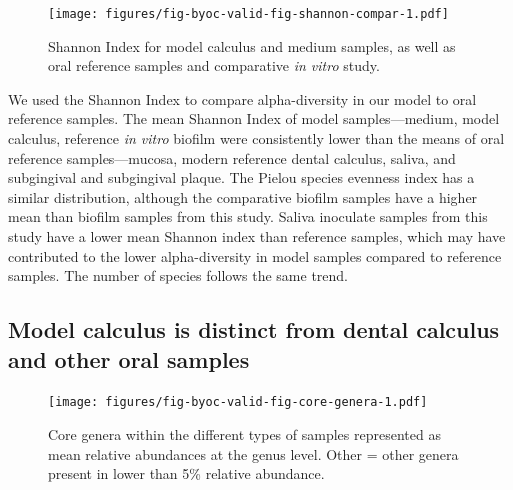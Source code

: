 \documentclass[
  letterpaper,
]{book}
\begin{document}
\begin{figure}

{\centering \texttt{[image: figures/fig-byoc-valid-fig-shannon-compar-1.pdf]}

}

\caption{\label{fig-shannon-compar}Shannon Index for model calculus and
medium samples, as well as oral reference samples and comparative
\emph{in vitro} study.}

\end{figure}

We used the Shannon Index to compare alpha-diversity in our model to
oral reference samples. The mean Shannon Index of model
samples---medium, model calculus, reference \emph{in vitro} biofilm were
consistently lower than the means of oral reference samples---mucosa,
modern reference dental calculus, saliva, and subgingival and
subgingival plaque. The Pielou species evenness index has a similar
distribution, although the comparative biofilm samples have a higher
mean than biofilm samples from this study. Saliva inoculate samples from
this study have a lower mean Shannon index than reference samples, which
may have contributed to the lower alpha-diversity in model samples
compared to reference samples. The number of species follows the same
trend.

\hypertarget{model-calculus-is-distinct-from-dental-calculus-and-other-oral-samples}{%
\subsection{Model calculus is distinct from dental calculus and other
oral
samples}\label{model-calculus-is-distinct-from-dental-calculus-and-other-oral-samples}}

\begin{figure}

{\centering \texttt{[image: figures/fig-byoc-valid-fig-core-genera-1.pdf]}

}

\caption{\label{fig-core-genera}Core genera within the different types
of samples represented as mean relative abundances at the genus level.
Other = other genera present in lower than 5\% relative abundance.}

\end{figure}
\end{document}
